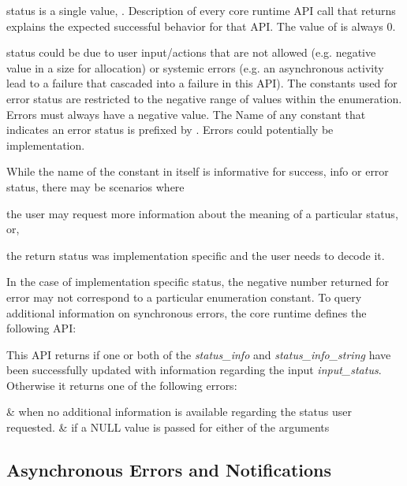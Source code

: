  status is a single value,
. Description of every core runtime
API call that returns  explains the
expected successful behavior for that API. The value of
 is always 0.

 status could be due to user input/actions that are not
allowed (e.g. negative value in a size for allocation) or systemic
errors (e.g. an asynchronous activity lead to a failure that
cascaded into a failure in this API). The constants used for error
status are restricted to the negative range of values within the
 enumeration. Errors must always have a
negative value. The Name of any constant that indicates an error status is
prefixed by . Errors could potentially be 
implementation.

While the name of the constant in itself is informative for success,
info or error status, there may be scenarios where
\begin{inparaenum}[(i)] \item the user may request more information
about the meaning of a particular status, or, \item the return
status was implementation specific and the user needs to decode it.
\end{inparaenum} In the case of implementation specific status, the
negative number returned for error may not correspond to a
particular enumeration constant. To query additional
information on synchronous errors, the core runtime defines the
following API:



This API returns  if one or both of the
{\itshape status\_info} and {\itshape status\_info\_string} have been 
successfully updated with information regarding the input
{\itshape input\_status}. Otherwise it returns one of the following errors:

\begin{easylist}
&  when no additional information is
available regarding the status user requested. 
&  if a NULL value is
passed for either of the arguments
\end{easylist}

\begin{DIFnomarkup}
\hypertarget{asyncerror}{}\subsection{Asynchronous Errors and
Notifications}\label{asyncerror}
\end{DIFnomarkup}


